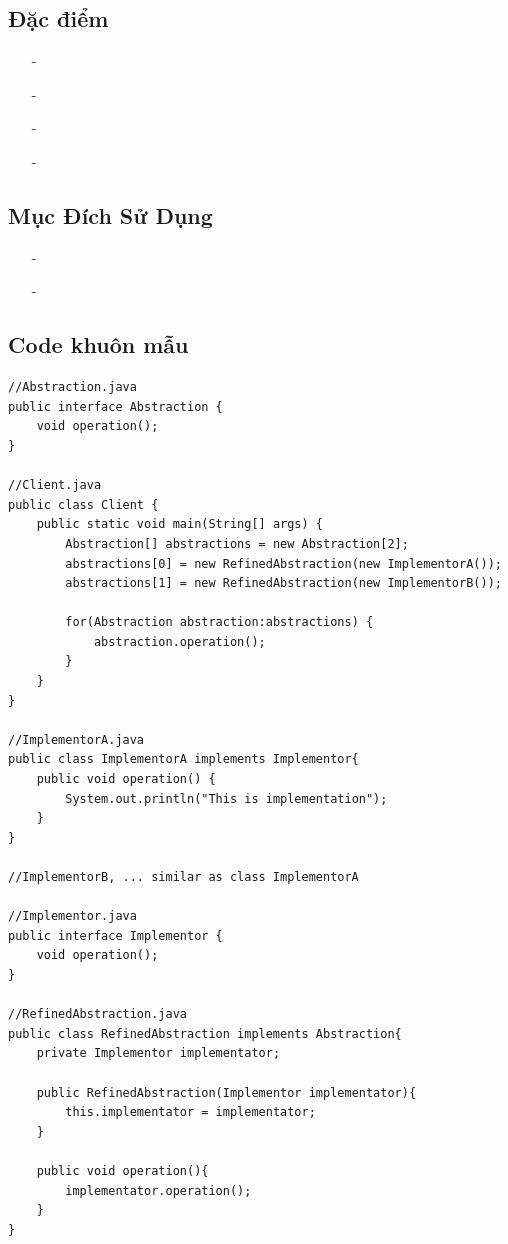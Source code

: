 \documentclass{article}
\newcommand\subpara{\fontsize{13}{13}\selectfont \fontseries{b}\selectfont}
\begin{document}
    \subsection{Đặc điểm}
    \begin{itemize}
        \item[-]\subpara{Giảm sự phụ thuộc giữa abstraction và implementation}
        \item[-]\subpara{Abstraction và implementation thay vì liên hệ bằng quan hệ kế thừa thì sẽ liên hệ với nhau thông qua object composition}
        \item[-]\subpara{Cho phép ẩn các chi tiết implement từ client}
        \item[-]\subpara{Dễ bảo trì và mở rộng về sau}
    \end{itemize}

    \subsection{Mục Đích Sử Dụng}
    \begin{itemize}
        \item[-]\subpara{Tách ràng buộc giữa abstraction và implementation để có thể dễ dàng mở rộng độc lập nhau}
        \item[-]\subpara{Thay đổi được thực thi trong implement mà không ảnh hưởng đến phía client}
    \end{itemize}

    \subsection{Code khuôn mẫu}
    \begin{lstlisting}
//Abstraction.java
public interface Abstraction {
	void operation();
}

//Client.java
public class Client {
	public static void main(String[] args) {
        Abstraction[] abstractions = new Abstraction[2];
        abstractions[0] = new RefinedAbstraction(new ImplementorA());
        abstractions[1] = new RefinedAbstraction(new ImplementorB());

        for(Abstraction abstraction:abstractions) {
            abstraction.operation();
        }
    }
}

//ImplementorA.java
public class ImplementorA implements Implementor{
	public void operation() {
        System.out.println("This is implementation");
    }
}

//ImplementorB, ... similar as class ImplementorA

//Implementor.java
public interface Implementor {
	void operation();
}

//RefinedAbstraction.java
public class RefinedAbstraction implements Abstraction{
    private Implementor implementator;

    public RefinedAbstraction(Implementor implementator){
        this.implementator = implementator;
    }

    public void operation(){
        implementator.operation();
    }
}
    \end{lstlisting}
\end{document}
